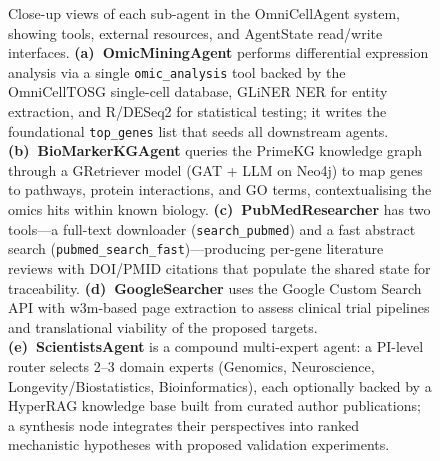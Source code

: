 \begin{figure}[p]
\begin{minipage}[t]{\textwidth}
{%
}
\par{}
\end{minipage}

\caption{Close-up views of each sub-agent in the OmniCellAgent system, showing
tools, external resources, and AgentState read/write interfaces.
\textbf{(a)~OmicMiningAgent} performs differential expression analysis via a
single \texttt{omic\_analysis} tool backed by the OmniCellTOSG single-cell
database, GLiNER NER for entity extraction, and R/DESeq2 for statistical
testing; it writes the foundational \texttt{top\_genes} list that seeds all
downstream agents.
\textbf{(b)~BioMarkerKGAgent} queries the PrimeKG knowledge graph through a
GRetriever model (GAT + LLM on Neo4j) to map genes to pathways, protein
interactions, and GO terms, contextualising the omics hits within known
biology.
\textbf{(c)~PubMedResearcher} has two tools---a full-text downloader
(\texttt{search\_pubmed}) and a fast abstract search
(\texttt{pubmed\_search\_fast})---producing per-gene literature reviews with
DOI/PMID citations that populate the shared state for traceability.
\textbf{(d)~GoogleSearcher} uses the Google Custom Search API with w3m-based
page extraction to assess clinical trial pipelines and translational viability
of the proposed targets.
\textbf{(e)~ScientistsAgent} is a compound multi-expert agent: a PI-level
router selects 2--3 domain experts (Genomics, Neuroscience,
Longevity/Biostatistics, Bioinformatics), each optionally backed by a
HyperRAG knowledge base built from curated author publications; a synthesis
node integrates their perspectives into ranked mechanistic hypotheses with
proposed validation experiments.}
\label{fig:agent-closeups}
\end{figure}
